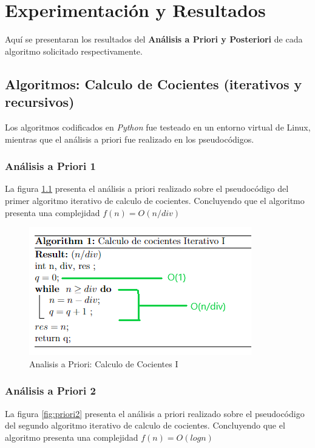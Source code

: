 \chapter{Experimentación y Resultados}
    Aquí se presentaran los resultados del \textbf{Análisis a Priori y Posteriori} de cada algoritmo solicitado respectivamente.
    
\section{Algoritmos: Calculo de Cocientes (iterativos y recursivos)}
    Los algoritmos codificados en \textit{Python} fue testeado en un entorno virtual de Linux, mientras que el análisis a priori fue realizado en los pseudocódigos. 
    
    \subsection{Análisis a Priori 1}
        La figura \ref{fig:priori1} presenta el análisis a priori realizado sobre el pseudocódigo del primer algoritmo iterativo de calculo de cocientes. Concluyendo que el algoritmo presenta una complejidad \(f(n) = O(n/div)\)
        
        \begin{figure}[htp!]
            \centering
            \includegraphics[width=0.7 \textwidth]{Images/A_Priori/priori_1.png}
            \caption{Analisis a Priori: Calculo de Cocientes I}
            \label{fig:priori1}
        \end{figure}
    \newpage    
    \subsection{Análisis a Priori 2}
        La figura \ref{fig:priori2} presenta el análisis a priori realizado sobre el pseudocódigo del segundo algoritmo iterativo de calculo de cocientes. Concluyendo que el algoritmo presenta una complejidad \(f(n) = O(logn)\)
        
